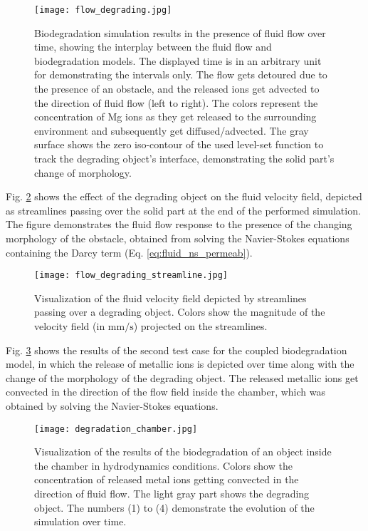 \begin{figure}[h]
\centering
\medskip
\texttt{[image: flow\_degrading.jpg]}
\caption[Biodegradation simulation results in the presence of fluid flow]{Biodegradation simulation results in the presence of fluid flow over time, showing the interplay between the fluid flow and biodegradation models. The displayed time is in an arbitrary unit for demonstrating the intervals only. The flow gets detoured due to the presence of an obstacle, and the released ions get advected to the direction of fluid flow (left to right). The colors represent the concentration of Mg ions as they get released to the surrounding environment and subsequently get diffused/advected. The gray surface shows the zero iso-contour of the used level-set function to track the degrading object's interface, demonstrating the solid part's change of morphology.} \label{fig:fluid_flow_degrading}
\end{figure}

Fig. \ref{fig:fluid_flow_degrading_streamline} shows the effect of the degrading object on the fluid velocity field, depicted as streamlines passing over the solid part at the end of the performed simulation. The figure demonstrates the fluid flow response to the presence of the changing morphology of the obstacle, obtained from solving the Navier-Stokes equations containing the Darcy term (Eq. \ref{eq:fluid_ns_permeab}).


\begin{figure}[h]
\centering
\medskip
\texttt{[image: flow\_degrading\_streamline.jpg]}
\caption[Fluid flow streamlines in the presence of a degrading object]{Visualization of the fluid velocity field depicted by streamlines passing over a degrading object. Colors show the magnitude of the velocity field (in $\mathrm{mm}/\mathrm{s}$) projected on the streamlines.} \label{fig:fluid_flow_degrading_streamline}
\end{figure}


Fig. \ref{fig:fluid_degradation_chamber} shows the results of the second test case for the coupled biodegradation model, in which the release of metallic ions is depicted over time along with the change of the morphology of the degrading object. The released metallic ions get convected in the direction of the flow field inside the chamber, which was obtained by solving the Navier-Stokes equations.


\begin{figure}[h]
\centering
\medskip
\texttt{[image: degradation\_chamber.jpg]}
\caption[Visualization of the biodegradation inside the chamber in the presence of fluid flow]{Visualization of the results of the biodegradation of an object inside the chamber in hydrodynamics conditions. Colors show the concentration of released metal ions getting convected in the direction of fluid flow. The light gray part shows the degrading object. The numbers (1) to (4) demonstrate the evolution of the simulation over time.} \label{fig:fluid_degradation_chamber}
\end{figure}


